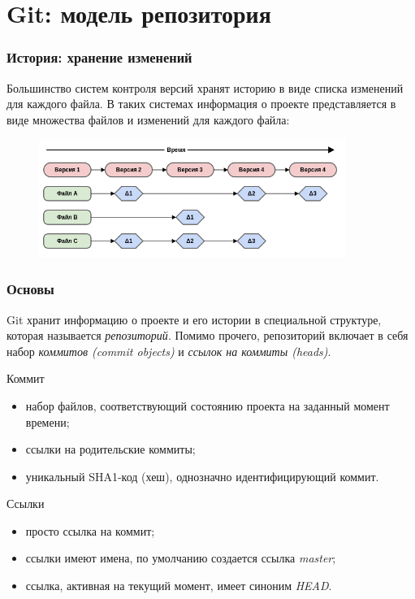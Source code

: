 \documentclass{beamer}
\begin{document}
\section{Git: модель репозитория}

\begin{frame}
  \frametitle{История: хранение изменений}
  Большинство систем контроля версий хранят историю в виде списка
  изменений для каждого файла. В таких системах информация о проекте
  представляется в виде множества файлов и изменений для каждого файла:

  \begin{figure}
     \includegraphics[width=10cm]{images/history-deltas.png}
  \end{figure}
\end{frame}

\begin{frame}
  \frametitle{Основы}
  Git хранит информацию о проекте и его истории в специальной структуре,
  которая называется {\it репозиторий}. Помимо прочего, репозиторий включает
  в себя набор {\it коммитов (commit objects)} и {\it ссылок на коммиты (heads)}.

  \begin{block}{Коммит}
    \begin{itemize}
      \item набор файлов, соответствующий состоянию проекта на заданный момент времени;
      \item ссылки на родительские коммиты;
      \item уникальный SHA1-код (хеш), однозначно идентифицирующий коммит.
    \end{itemize}
  \end{block}

  \begin{block}{Ссылки}
    \begin{itemize}
      \item просто ссылка на коммит;
      \item ссылки имеют имена, по умолчанию создается ссылка {\it master};
      \item ссылка, активная на текущий момент, имеет синоним {\it HEAD}.
    \end{itemize}
  \end{block}
\end{frame}
\end{document}
